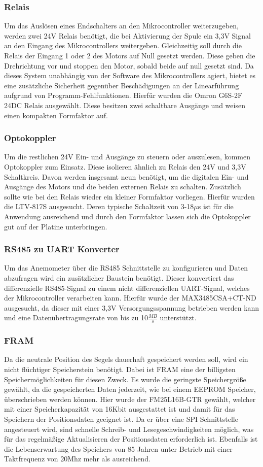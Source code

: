 \subsubsection{Relais}
Um das Auslösen eines Endschalters an den Mikrocontroller weiterzugeben, werden zwei 24V Relais benötigt, die bei Aktivierung der Spule ein 3,3V Signal an den Eingang des Mikrocontrollers weitergeben. Gleichzeitig soll durch die Relais der Eingang 1 oder 2 des Motors auf Null gesetzt werden. Diese geben die Drehrichtung vor und stoppen den Motor, sobald beide auf null gesetzt sind. Da dieses System unabhängig von der Software des Mikrocontrollers agiert, bietet es eine zusätzliche Sicherheit gegenüber Beschädigungen an der Linearführung aufgrund von Programm-Fehlfunktionen. Hierfür wurden die Omron G6S-2F 24DC Relais ausgewählt. Diese besitzen zwei schaltbare Ausgänge und weisen einen kompakten Formfaktor auf.
\subsubsection{Optokoppler}
Um die restlichen 24V Ein- und Ausgänge zu steuern oder auszulesen, kommen Optokoppler zum Einsatz. Diese isolieren ähnlich zu Relais den 24V und 3,3V Schaltkreis. Davon werden insgesamt neun benötigt, um die digitalen Ein- und Ausgänge des Motors und die beiden externen Relais zu schalten. Zusätzlich sollte wie bei den Relais wieder ein kleiner Formfaktor vorliegen. Hierfür wurden die LTV-817S ausgesucht. Deren typische Schaltzeit von 3-18$\mu$s ist für die Anwendung ausreichend und durch den Formfaktor lassen sich die Optokoppler gut auf der Platine unterbringen.
\subsubsection{RS485 zu UART Konverter}
Um das Anemometer über die RS485 Schnittstelle zu konfigurieren und Daten abzufragen wird ein zusätzlicher Baustein benötigt. Dieser konvertiert das differenzielle RS485-Signal zu einem nicht differenziellen \ac{UART}-Signal, welches der Mikrocontroller verarbeiten kann. Hierfür wurde der MAX3485CSA+CT-ND ausgesucht, da dieser mit einer 3,3V Versorgungsspannung betrieben werden kann und eine Datenübertragungsrate von bis zu 10$\frac{MB}{s}$ unterstützt.
\subsubsection{FRAM}
Da die neutrale Position des Segels dauerhaft gespeichert werden soll, wird ein nicht flüchtiger Speicherstein benötigt. Dabei ist \ac{FRAM} eine der billigsten Speichermöglichkeiten für diesen Zweck. Es wurde die geringste Speichergröße gewählt, da die gespeicherten Daten jederzeit, wie bei einem EEPROM Speicher, überschrieben werden können. Hier wurde der FM25L16B-GTR gewählt, welcher mit einer Speicherkapazität von 16Kbit ausgestattet ist und damit für das Speichern der Positionsdaten geeignet ist. Da er über eine \ac{SPI} Schnittstelle angesteuert wird, sind schnelle Schreib- und Lesegeschwindigkeiten möglich, was für das regelmäßige Aktualisieren der Positionsdaten erforderlich ist. Ebenfalls ist die Lebenserwartung des Speichers von 85 Jahren unter Betrieb mit einer Taktfrequenz von 20Mhz mehr als ausreichend.
